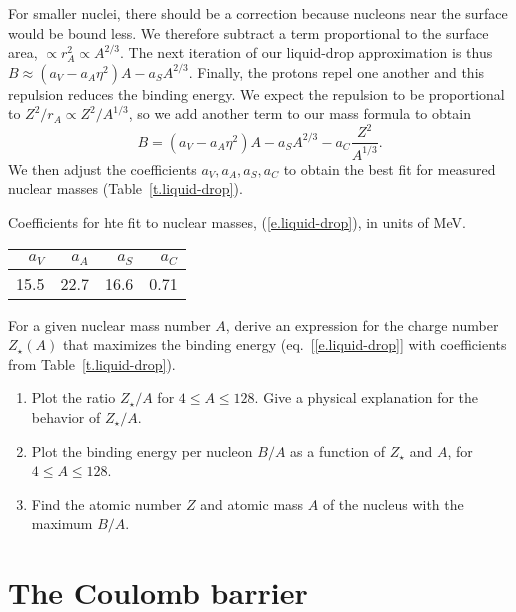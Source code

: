 For smaller nuclei, there should be a correction because nucleons near the surface would be bound less. We therefore subtract a term proportional to the surface area, $\propto r_{A}^{2} \propto A^{2/3}$. The next iteration of our liquid-drop approximation is thus $B \approx (a_{V}- a_{A}\eta^{2})A - a_{S}A^{2/3} $. Finally, the protons repel one another and this repulsion reduces the binding energy. We expect the repulsion to be proportional to $Z^{2}/r_{A}\propto Z^{2}/A^{1/3}$, so we add another term to our mass formula to obtain
\begin{equation}\label{e.liquid-drop}
B = \left(a_{V} -a_{A}\eta^{2}\right) A -  a_{S}A^{2/3} - a_{C} \frac{Z^{2}}{A^{1/3}}. 
\end{equation}
We then adjust the coefficients $a_{V},a_{A},a_{S},a_{C}$ to obtain the best fit
for measured nuclear masses (Table~\ref{t.liquid-drop}).
\begin{margintable}
\caption[Liquid-drop coefficients]{\label{t.liquid-drop} Coefficients for hte fit to nuclear masses, (\protect\ref{e.liquid-drop}), in units of MeV.}
\begin{tabular}{rrrr}
$a_V$ & $a_A$ & $a_S$ & $a_C$ \\
\hline
15.5 & 22.7 & 16.6 & 0.71\\
\end{tabular}
\end{margintable}

\begin{exercisebox}
For a given nuclear mass number $A$, derive an expression for the charge number $Z_{\star}(A)$ that maximizes the binding energy (eq.~[\ref{e.liquid-drop}] with coefficients from Table~\ref{t.liquid-drop}).
\begin{enumerate}
\item Plot the ratio $Z_{\star}/A$ for $4\le A\le 128$. Give a physical explanation for the behavior of $Z_{\star}/A$.
\item Plot the binding energy per nucleon $B/A$ as a function of $Z_{\star}$ and $A$, for $4\le A\le 128$.
\item Find the atomic number $Z$ and atomic mass $A$ of the nucleus with the maximum $B/A$.
\end{enumerate}
\end{exercisebox}

\section{The Coulomb barrier}


